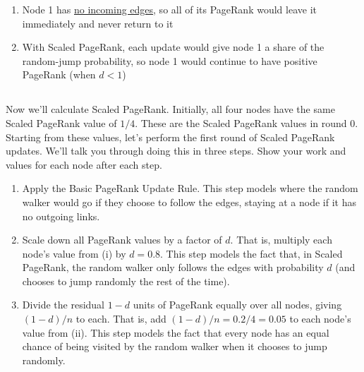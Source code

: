 \documentclass[newpages]{assignment}
\begin{document}
\begin{enumerate}
    \item[i.] Node 1 has \underline{no incoming edges}, so all of its PageRank would leave it immediately and never return to it
    \item[ii.] With Scaled PageRank, each update would give node 1 a share of the random-jump probability, so node 1 would continue to have positive PageRank (when $d<1$)
\end{enumerate}

\subsection{}
\begin{problem}
    Now we'll calculate Scaled PageRank. Initially, all four nodes have the same Scaled PageRank value of \(1/4\). These are the Scaled PageRank values in round 0. Starting from these values, let's perform the first round of Scaled PageRank updates. We'll talk you through doing this in three steps. Show your work and values for each node after each step.

    \begin{enumerate}[label=\roman*.]
        \item Apply the Basic PageRank Update Rule. This step models where the random walker would go if they choose to follow the edges, staying at a node if it has no outgoing links.
        \item Scale down all PageRank values by a factor of \(d\). That is, multiply each node's value from (i) by \(d=0.8\). This step models the fact that, in Scaled PageRank, the random walker only follows the edges with probability \(d\) (and chooses to jump randomly the rest of the time).
        \item Divide the residual \(1-d\) units of PageRank equally over all nodes, giving \((1-d)/n\) to each. That is, add \((1-d)/n=0.2/4=0.05\) to each node's value from (ii). This step models the fact that every node has an equal chance of being visited by the random walker when it chooses to jump randomly.
    \end{enumerate}
\end{problem}
\end{document}
